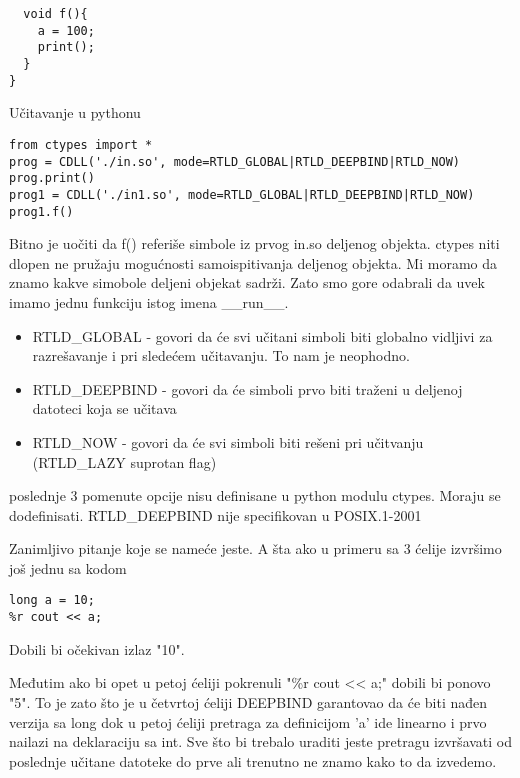 \documentclass[a4paper]{article}
\begin{document}
{\begin{minipage}[t]{.45\textwidth}
\begin{verbatim}
  void f(){
    a = 100;
    print();
  }
}
\end{verbatim} \end{minipage}


Učitavanje u pythonu

\begin{verbatim}
from ctypes import *                                                            
prog = CDLL('./in.so', mode=RTLD_GLOBAL|RTLD_DEEPBIND|RTLD_NOW)                                        
prog.print()                                                                    
prog1 = CDLL('./in1.so', mode=RTLD_GLOBAL|RTLD_DEEPBIND|RTLD_NOW)                                      
prog1.f() 
\end{verbatim}

Bitno je uočiti da f() referiše simbole iz prvog in.so deljenog objekta.
ctypes niti dlopen ne pružaju mogućnosti samoispitivanja deljenog objekta.
Mi moramo da znamo kakve simobole deljeni objekat sadrži.
Zato smo gore odabrali da uvek imamo jednu funkciju istog imena \_\_run\_\_.

\begin{itemize}
  \item RTLD\_GLOBAL - govori da će svi učitani simboli biti globalno vidljivi za razrešavanje i \cite{dlopen}
    pri sledećem učitavanju. To nam je neophodno.
  \item RTLD\_DEEPBIND - govori da će simboli prvo biti traženi u deljenoj datoteci koja se učitava \cite{dlopen}
  \item RTLD\_NOW - govori da će svi simboli biti rešeni pri učitvanju (RTLD\_LAZY suprotan flag) \cite{dlopen}
\end{itemize}

poslednje 3 pomenute opcije nisu definisane u python modulu ctypes. Moraju se dodefinisati.
RTLD\_DEEPBIND nije specifikovan u POSIX.1-2001

Zanimljivo  pitanje koje se nameće jeste. A šta ako u primeru sa 3 ćelije izvršimo
još jednu sa kodom 

\begin{verbatim}
long a = 10;
%r cout << a;
\end{verbatim}

Dobili bi očekivan izlaz "10".

Međutim ako bi opet u petoj ćeliji pokrenuli "\%r cout << a;" dobili bi
ponovo "5". To je zato što je u četvrtoj ćeliji DEEPBIND garantovao da će
biti nađen verzija sa long dok u petoj ćeliji pretraga za definicijom 'a'
ide linearno i prvo nailazi na deklaraciju sa int. Sve što bi trebalo uraditi
jeste pretragu izvršavati od poslednje učitane datoteke do prve ali trenutno
ne znamo kako to da izvedemo.

}
\end{document}
